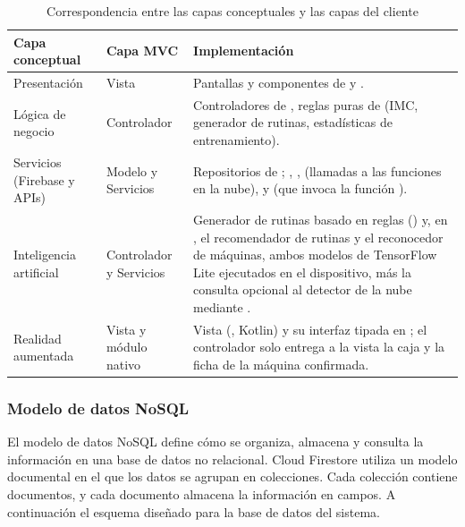 \begin{table}[H]
\centering
\small
\begin{tabularx}{\textwidth}{|L{3.4cm}|L{2.6cm}|Y|}
\hline
{} \textbf{Capa conceptual} & \textbf{Capa MVC} & \textbf{Implementación} \\
\hline
Presentación & Vista & Pantallas y componentes de  y
. \\ \hline
Lógica de negocio & Controlador & Controladores de ,
reglas puras de  (IMC, generador de rutinas, estadísticas de
entrenamiento). \\ \hline
Servicios (Firebase y APIs) & Modelo y Servicios & Repositorios de
; ,
,  (llamadas a las funciones
en la nube),  y  (que invoca la función
). \\ \hline
Inteligencia artificial & Controlador y Servicios & Generador de rutinas
basado en reglas () y, en , el
recomendador de rutinas y el reconocedor de máquinas, ambos modelos de
TensorFlow Lite ejecutados en el dispositivo, más la consulta opcional al
detector de la nube mediante . \\ \hline
Realidad aumentada & Vista y módulo nativo & Vista 
(, Kotlin) y su interfaz tipada en
; el controlador solo entrega a la vista la caja y la
ficha de la máquina confirmada. \\
\hline
\end{tabularx}
\caption{Correspondencia entre las capas conceptuales y las capas del cliente}
\label{tab:capas-mvc}
\end{table}

\subsubsection{Modelo de datos NoSQL}
\label{subsec:modelo-datos}

El modelo de datos NoSQL define cómo se organiza, almacena y consulta la 
información en una base de datos no relacional. Cloud Firestore utiliza 
un modelo documental en el que los datos se agrupan en colecciones. 
Cada colección contiene documentos, y cada documento almacena la información 
en campos.
A continuación el esquema diseñado para la base de datos del sistema.

